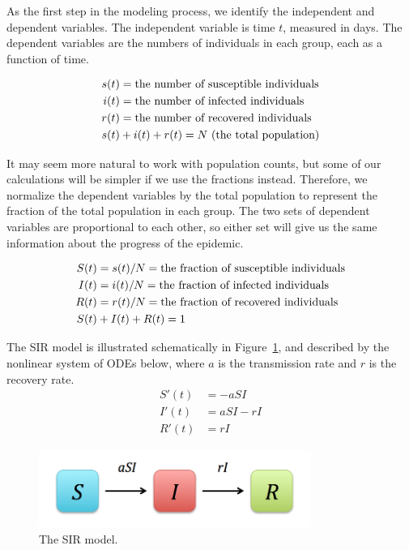 \documentclass[10pt,letterpaper]{article}
\begin{document}
As the first step in the modeling process, we identify the independent and dependent variables. The independent variable is time $t$, measured in days. The dependent variables are the numbers of individuals in each group, each as a function of time.

\begin{align*}
s(t) &= \textnormal{the number of susceptible individuals} \\ 
i(t) &= \textnormal{the number of infected individuals} \\ 
r(t) &= \textnormal{the number of recovered individuals} \\ 
s(t)&+i(t)+r(t) = N \textnormal{ (the total population)}
\end{align*}

It may seem more natural to work with population counts, but some of our calculations will be simpler if we use the fractions instead. Therefore, we normalize the dependent variables by the total population to represent the fraction of the total population in each group. The two sets of dependent variables are proportional to each other, so either set will give us the same information about the progress of the epidemic.

\begin{align*}
S(t) &= s(t)/N = \textnormal{the fraction of susceptible individuals} \\
I(t) &= i(t)/N = \textnormal{the fraction of infected individuals} \\
R(t) &= r(t)/N = \textnormal{the fraction of recovered individuals}\\
S(t)&+I(t)+R(t) = 1
\end{align*}


The SIR model is illustrated schematically in Figure~\ref{fig:SIR}, and described by the nonlinear system of ODEs below, where $a$ is the transmission rate and $r$ is the recovery rate. 
\begin{align}
S'(t) &= -a S I \\
I'(t) &= a S I - r I \\
R'(t) &= r I
\end{align}

\begin{figure}[htb]
\includegraphics[width=3.5in]{SIR}
\centering
\caption{\label{fig:SIR}The SIR model.}
\end{figure}
\end{document}
